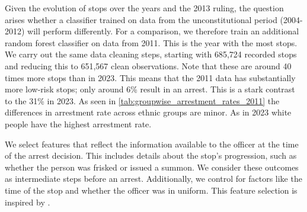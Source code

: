 Given the evolution of stops over the years and the 2013 ruling, the question arises whether a classifier trained on data from the unconstitutional period (2004-2012) will perform differently.
For a comparison, we therefore train an additional random forest classifier on data from 2011. This is the year with the most stops. We carry out the same data cleaning steps, starting with 685,724 recorded stops and reducing this to 651,567 clean observations. Note that these are around 40 times more stops than in 2023.
This means that the 2011 data has substantially more low-risk stops; only around 6\% result in an arrest. This is a stark contrast to the 31\% in 2023. As seen in \autoref{tab:groupwise_arrestment_rates_2011} the differences in arrestment rate across ethnic groups are minor. As in 2023 white people have the highest arrestment rate.\par
We select features that reflect the information available to the officer at the time of the arrest decision. This includes details about the stop's progression, such as whether the person was frisked or issued a summon. We consider these outcomes as intermediate steps before an arrest. Additionally, we control for factors like the time of the stop and whether the officer was in uniform. This feature selection is inspired by \cite{Badr2022DTFANSP}.

